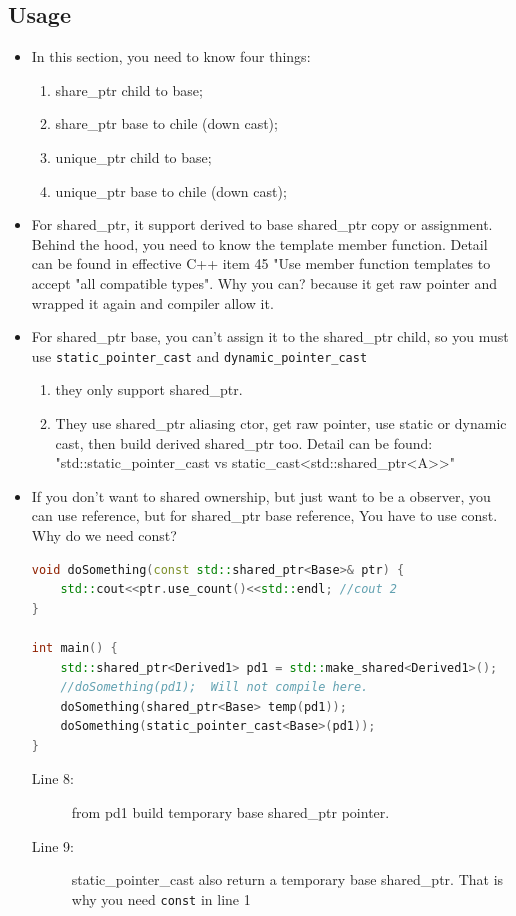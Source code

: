 \documentclass[a4paper,11pt,twoside]{book}
\begin{document}
\subsection{Usage}
\begin{itemize}
\item In this section, you need to know four things:
\begin{enumerate}
\item share\_ptr child to base;
\item share\_ptr base to chile (down cast);
\item unique\_ptr child to base;
\item unique\_ptr base to chile (down cast);
\end{enumerate}


		\item For shared\_ptr, it support derived to base shared\_ptr copy or assignment. Behind the hood, you need to know the template member function. Detail can be found in effective C++ item 45 "Use member function templates to accept "all compatible types". Why you can? because it get raw pointer and wrapped it again and compiler allow it.

		\item  For shared\_ptr base, you can't assign it to the shared\_ptr child, so you must use \texttt{static\_pointer\_cast} and \texttt{dynamic\_pointer\_cast}
		\begin{enumerate}
			\item they only support shared\_ptr.
			\item They use shared\_ptr aliasing ctor, get raw pointer, use static or dynamic cast, then build derived shared\_ptr too. Detail can be found: \\
			"std::static\_pointer\_cast vs static\_cast<std::shared\_ptr<A>>"
		\end{enumerate}

		\item If you don't want to shared ownership, but just want to be a observer, you can use reference, but for shared\_ptr base reference, You have to use const. Why do we need const?
	
\begin{lstlisting}[frame=single, language=c++, mathescape=true]
void doSomething(const std::shared_ptr<Base>& ptr) {
    std::cout<<ptr.use_count()<<std::endl; //cout 2
}

int main() {
	std::shared_ptr<Derived1> pd1 = std::make_shared<Derived1>();
	//doSomething(pd1);  Will not compile here.
	doSomething(shared_ptr<Base> temp(pd1));
	doSomething(static_pointer_cast<Base>(pd1));
}
\end{lstlisting}
	\begin{description}
	\item[Line 8:] from pd1 build temporary base shared\_ptr pointer.
	\item[Line 9:] static\_pointer\_cast also return a temporary base shared\_ptr. That is why you need \texttt{const} in line 1
\end{description}


\end{itemize}
\end{document}
